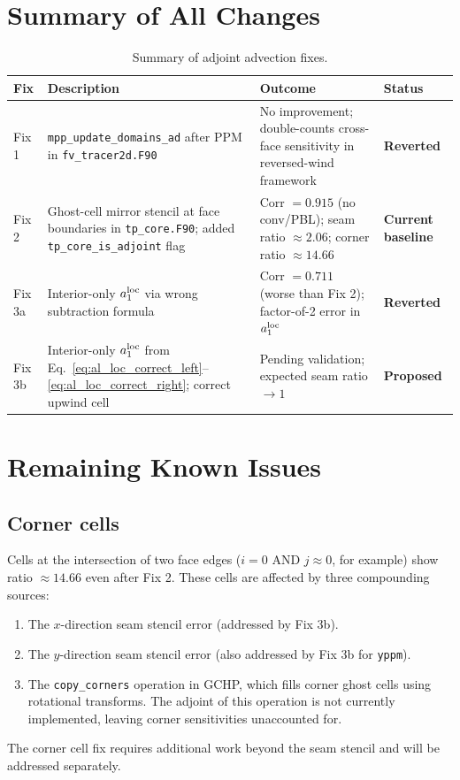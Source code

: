 \documentclass[11pt]{article}
\begin{document}
\section{Summary of All Changes}

\begin{table}[h]
\centering
\caption{Summary of adjoint advection fixes.}
\begin{tabular}{p{1.5cm} p{3.5cm} p{4.5cm} p{2.5cm}}
\toprule
Fix & Description & Outcome & Status \\
\midrule
Fix 1 & \texttt{mpp\_update\_domains\_ad} after PPM in \texttt{fv\_tracer2d.F90}
  & No improvement; double-counts cross-face sensitivity in reversed-wind framework
  & \textbf{Reverted} \\[6pt]
Fix 2 & Ghost-cell mirror stencil at face boundaries in \texttt{tp\_core.F90};
  added \texttt{tp\_core\_is\_adjoint} flag
  & Corr $= 0.915$ (no conv/PBL); seam ratio $\approx 2.06$; corner ratio $\approx 14.66$
  & \textbf{Current baseline} \\[6pt]
Fix 3a & Interior-only $a_1^{\rm loc}$ via wrong subtraction formula
  & Corr $= 0.711$ (worse than Fix 2); factor-of-2 error in $a_1^{\rm loc}$
  & \textbf{Reverted} \\[6pt]
Fix 3b & Interior-only $a_1^{\rm loc}$ from Eq.~\eqref{eq:al_loc_correct_left}--\eqref{eq:al_loc_correct_right};
  correct upwind cell
  & Pending validation; expected seam ratio $\to 1$
  & \textbf{Proposed} \\
\bottomrule
\end{tabular}
\label{tab:summary}
\end{table}

\section{Remaining Known Issues}

\subsection{Corner cells}

Cells at the intersection of two face edges ($i=0$ AND $j \approx 0$, for
example) show ratio $\approx 14.66$ even after Fix 2. These cells are
affected by three compounding sources:
\begin{enumerate}
  \item The $x$-direction seam stencil error (addressed by Fix 3b).
  \item The $y$-direction seam stencil error (also addressed by Fix 3b for \texttt{yppm}).
  \item The \texttt{copy\_corners} operation in GCHP, which fills corner ghost
    cells using rotational transforms. The adjoint of this operation is not
    currently implemented, leaving corner sensitivities unaccounted for.
\end{enumerate}
The corner cell fix requires additional work beyond the seam stencil and will
be addressed separately.
\end{document}
